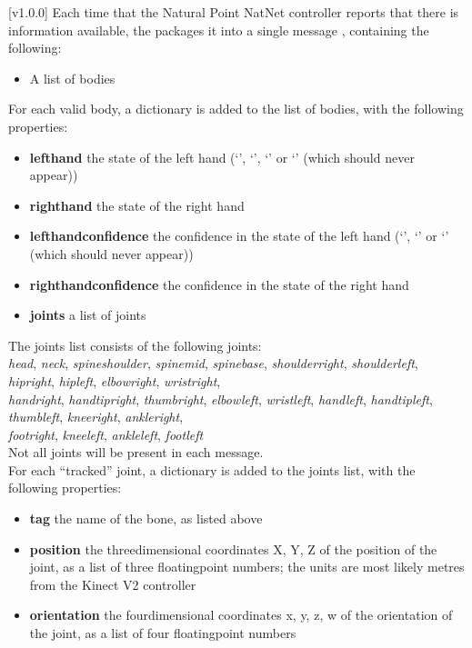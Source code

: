 [v1.0.0]
Each time that the Natural Point NatNet controller reports that there is information
available, the  packages it into a single message
\openSq{}\closeSq, containing the following:
\begin{itemize}
\item A list of bodies
\end{itemize}

For each valid body, a dictionary \openSq{}\closeSq{} is added to the list
of bodies, with the following properties:
\begin{itemize}
\item\textbf{lefthand} \longDash{} the state of the left hand (`',
`', `' or `' (which should never appear))
\item\exSp\textbf{righthand} \longDash{} the state of the right hand
\item\exSp\textbf{lefthandconfidence} \longDash{} the confidence in the state of the left
hand (`', `' or `' (which should never appear))
\item\exSp\textbf{righthandconfidence} \longDash{} the confidence in the state of the
right hand
\item\exSp\textbf{joints} \longDash{} a list of joints
\end{itemize}

The joints list consists of the following joints:\\
\textbraceleft{} \emph{head}, \emph{neck}, \emph{spineshoulder}, \emph{spinemid},
\emph{spinebase}, \emph{shoulderright}, \emph{shoulderleft}, \emph{hipright},
\emph{hipleft}, \emph{elbowright}, \emph{wristright},\\
\emph{handright}, \emph{handtipright}, \emph{thumbright}, \emph{elbowleft},
\emph{wristleft}, \emph{handleft}, \emph{handtipleft}, \emph{thumbleft}, \emph{kneeright},
\emph{ankleright},\\
\emph{footright}, \emph{kneeleft}, \emph{ankleleft}, \emph{footleft} \textbraceright\\

Not all joints will be present in each message.\\

For each ``tracked'' joint, a dictionary is added to the joints list, with the following
properties:
\begin{itemize}
\item\textbf{tag} \longDash{} the name of the bone, as listed above
\item\exSp\textbf{position} \longDash{} the three\longDash{}dimensional coordinates
\openSq{}X, Y, Z\closeSq{} of the position of the joint, as a list of three
floating\longDash{}point numbers; the units are most likely metres from the Kinect V2
controller
\item\exSp\textbf{orientation} \longDash{} the four\longDash{}dimensional coordinates
\openSq{}x, y, z, w\closeSq{} of the orientation of the joint, as a list of four
floating\longDash{}point numbers
\end{itemize}
\primaryEnd{}
